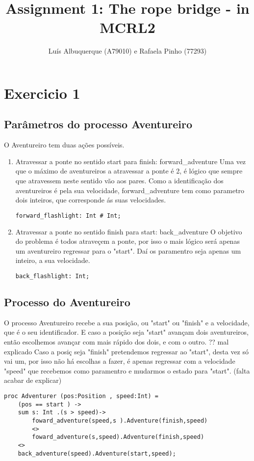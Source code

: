 \documentclass[11pt, oneside]{article}   	%
\title{Assignment 1: The rope bridge - in MCRL2}
\author{Lu\'is Albuquerque (A79010) e Rafaela Pinho (77293)}
\begin{document}
\maketitle

\newpage
\tableofcontents 
\newpage

\section{Exercicio 1}
\subsection{Parâmetros do processo Aventureiro }
O Aventureiro tem duas a\c{c}\~oes possíveis. \newline
\begin{enumerate}
\item Atravessar a ponte no sentido start para finish: forward\_adventure\newline
Uma vez que o m\'aximo de aventureiros a atravessar a ponte \'e 2, \'e l\'ogico  que sempre que atravessem neste sentido v\~ao aos pares. Como a identifica\c{c}\~ao dos aventureiros \'e pela sua velocidade, forward\_adventure tem como parametro dois inteiros, que corresponde \'as suas velocidades. 
\begin{lstlisting}
forward_flashlight: Int # Int;
\end{lstlisting}

\item Atravessar a ponte no sentido finish para start:  back\_adventure\newline
O objetivo do problema \'e todos atrave\c{c}em a ponte, por isso o mais l\'ogico ser\'a apenas um aventureiro regressar para o "start". Da\'i os paramentro seja apenas um inteiro, a sua velocidade.   
\begin{lstlisting}
back_flashlight: Int;
\end{lstlisting}
\end{enumerate}

\subsection{Processo do Aventureiro }
 O processo Aventureiro recebe a sua posi\c{c}\~ao, ou "start" ou "finish" e a velocidade, que \'e o seu identificador. E caso a posi\c{c}\~ao seja "start"  avan\c{c}am dois aventureiros, ent\~ao escolhemos avan\c{c}ar com mais r\'apido dos dois, e com o outro. ?? mal explicado
 \newline Caso a posi\c{c} seja "finish" pretendemos regressar ao "start", desta vez só vai um, por isso n\~ao h\'a escolhas a fazer, é apenas regressar com a velocidade "speed" que recebemos como paramentro  e mudarmos o estado para "start".
\newline(falta acabar de explicar)
\begin{lstlisting}
proc Adventurer (pos:Position , speed:Int) =
	(pos == start ) ->
	sum s: Int .(s > speed)->
		foward_adventure(speed,s ).Adventure(finish,speed)
		<>
		foward_adventure(s,speed).Adventure(finish,speed)
	<>
	back_adventure(speed).Adventure(start,speed);
\end{lstlisting}
\end{document}
